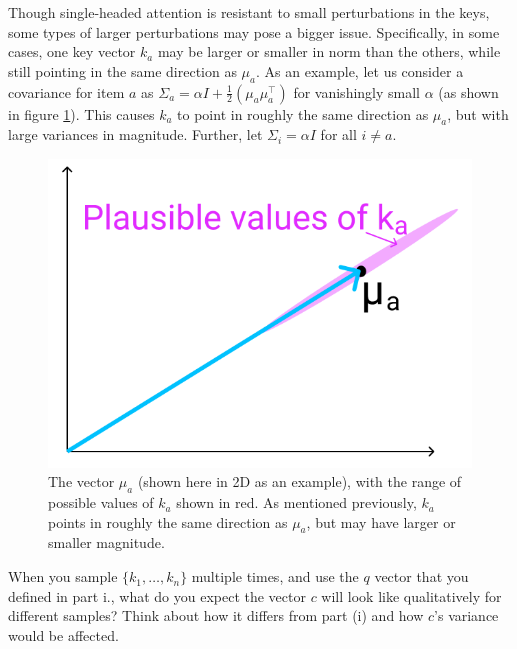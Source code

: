 \begin{parts}
\begin{subparts}
\subpart[3] Though single-headed attention is resistant to small perturbations in the keys, some types of larger perturbations may pose a bigger issue. Specifically, in some cases, one key vector $k_a$ may be larger or smaller in norm than the others, while still pointing in the same direction as $\mu_a$. As an example, let us consider a covariance for item $a$ as $\Sigma_a = \alpha I + \frac{1}{2}(\mu_a\mu_a^\top)$ for vanishingly small $\alpha$ (as shown in figure \ref{ka_plausible}). This causes $k_a$ to point in roughly the same direction as $\mu_a$, but with large variances in magnitude. Further, let $\Sigma_i = \alpha I$ for all $i \neq a$. %
\begin{figure}[h]
\centering
\captionsetup{justification=centering,margin=2cm}
\includegraphics[width=0.35\linewidth]{images/ka_plausible.png}
\caption{The vector $\mu_a$ (shown here in 2D as an example), with the range of possible values of $k_a$ shown in red. As mentioned previously, $k_a$ points in roughly the same direction as $\mu_a$, but may have larger or smaller magnitude.}
\label{ka_plausible}
\end{figure}

When you sample $\{k_1,\dots,k_n\}$ multiple times, and use the $q$ vector that you defined in part i., what do you expect the vector $c$ will look like qualitatively for different samples? Think about how it differs from part (i) and how $c$'s variance would be affected.

\end{subparts}
\end{parts}
